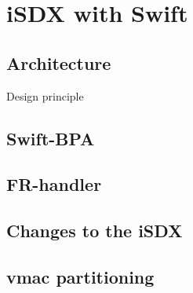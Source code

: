 \chapter{\label{chapter3}iSDX with Swift}

\section{\label{chapter3:Architecture}Architecture}

Design principle

\section{\label{chapter3:Swift-BPA}Swift-BPA}

\section{\label{chapter3:FR-handler}FR-handler}

\section{\label{chapter3:Changes to the iSDX}Changes to the iSDX}

\section{\label{chapter3:vmac partitioning}vmac partitioning}